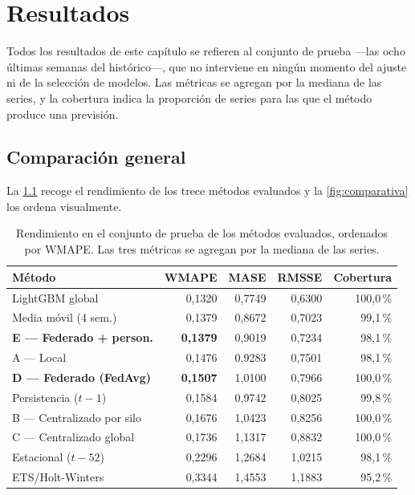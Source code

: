 \chapter{Resultados}
\label{cap:resultados}

Todos los resultados de este capítulo se refieren al conjunto de prueba —las ocho últimas semanas
del histórico—, que no interviene en ningún momento del ajuste ni de la selección de modelos. Las
métricas se agregan por la mediana de las series, y la cobertura indica la proporción de series
para las que el método produce una previsión.

\section{Comparación general}

La \cref{tab:comparativa} recoge el rendimiento de los trece métodos evaluados y la
\cref{fig:comparativa} los ordena visualmente.

\begin{table}[H]
  \centering
  \caption[Comparación de los métodos evaluados]{Rendimiento en el conjunto de prueba de los
  métodos evaluados, ordenados por WMAPE. Las tres métricas se agregan por la mediana de las
  series.}
  \label{tab:comparativa}
  \begin{tabular}{lrrrr}
    \toprule
    Método & WMAPE & MASE & RMSSE & Cobertura \\
    \midrule
    LightGBM global                    & 0,1320 & 0,7749 & 0,6300 & 100,0\,\% \\
    Media móvil (4 sem.)               & 0,1379 & 0,8672 & 0,7023 & 99,1\,\% \\
    \textbf{E — Federado + person.}    & \textbf{0,1379} & 0,9019 & 0,7234 & 98,1\,\% \\
    A — Local                          & 0,1476 & 0,9283 & 0,7501 & 98,1\,\% \\
    \textbf{D — Federado (FedAvg)}     & \textbf{0,1507} & 1,0100 & 0,7966 & 100,0\,\% \\
    Persistencia ($t-1$)               & 0,1584 & 0,9742 & 0,8025 & 99,8\,\% \\
    B — Centralizado por silo          & 0,1676 & 1,0423 & 0,8256 & 100,0\,\% \\
    C — Centralizado global            & 0,1736 & 1,1317 & 0,8832 & 100,0\,\% \\
    Estacional ($t-52$)                & 0,2296 & 1,2684 & 1,0215 & 98,1\,\% \\
    ETS/Holt-Winters                   & 0,3344 & 1,4553 & 1,1883 & 95,2\,\% \\
    \bottomrule
  \end{tabular}
\end{table}

